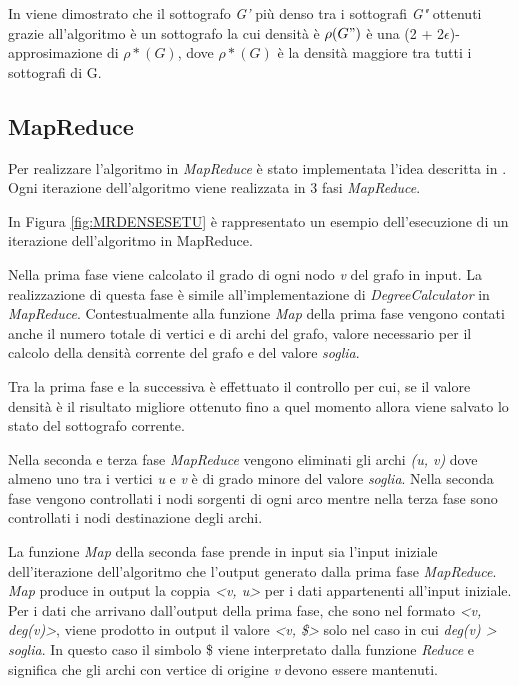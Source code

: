 \documentclass[LaM,binding=0.6cm]{sapthesis}
\begin{document}
In \cite{Bahmani:2012:DSS:2140436.2140442} viene dimostrato che il sottografo \textit{G'} più denso tra i sottografi \textit{G"} ottenuti grazie all'algoritmo è un sottografo la cui densità è $\rho(G")$ è una  (2 + 2$\epsilon$)-approsimazione di $\rho*(G)$, dove $\rho*(G)$ è la densità maggiore tra tutti i sottografi di G.

\begin{minipage}{\linewidth}

\end{minipage}

\subsection{MapReduce}

Per realizzare l'algoritmo in \textit{MapReduce} è stato implementata l'idea descritta in \cite{Bahmani:2012:DSS:2140436.2140442}. Ogni iterazione dell'algoritmo viene realizzata in 3 fasi \textit{MapReduce}.


In Figura \ref{fig:MRDENSESETU} è rappresentato un esempio dell'esecuzione di un iterazione dell'algoritmo in MapReduce.

Nella prima fase viene calcolato il grado di ogni nodo \textit{v} del grafo in input. La realizzazione di questa fase è simile all'implementazione di \textit{DegreeCalculator} in \textit{MapReduce}. Contestualmente alla funzione \textit{Map} della prima fase vengono contati anche il numero totale di vertici e di archi del grafo, valore necessario per il calcolo della densità corrente del grafo e del valore \textit{soglia}. 

Tra la prima fase e la successiva è effettuato il controllo  per cui, se il valore densità è il risultato migliore ottenuto fino a quel momento allora viene salvato lo stato del sottografo corrente.

Nella seconda e terza fase \textit{MapReduce} vengono eliminati gli archi \textit{(u, v)} dove almeno uno tra i vertici \textit{u} e \textit{v} è di grado minore del valore \textit{soglia}. 
Nella seconda fase vengono controllati i nodi sorgenti di ogni arco mentre nella terza fase sono controllati i nodi destinazione degli archi.

La funzione \textit{Map} della seconda fase prende in input sia l'input iniziale dell'iterazione dell'algoritmo che l'output generato dalla prima fase \textit{MapReduce}.
\textit{Map} produce in output la coppia \textit{<v, u>} per i dati appartenenti all'input iniziale. Per i dati che arrivano dall'output della prima fase, che sono nel formato \textit{<v, deg(v)>}, viene prodotto in output il valore \textit{<v, \$>} solo nel caso in cui \textit{deg(v) > soglia}. In questo caso il simbolo \$ viene interpretato dalla funzione \textit{Reduce} e significa che gli archi con vertice di origine \textit{v} devono essere mantenuti.
\end{document}
